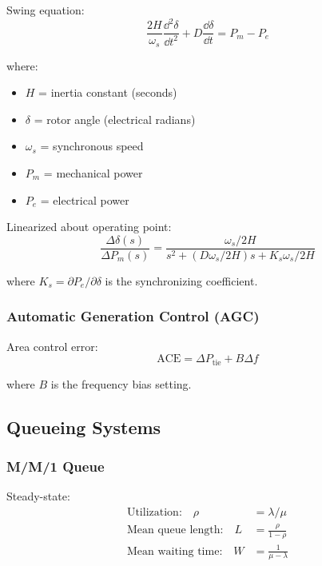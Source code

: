 Swing equation:
\begin{equation}
\frac{2H}{\omega_s}\frac{\dd^2\delta}{\dd t^2} + D\frac{\dd\delta}{\dd t} = P_m - P_e
\end{equation}

where:
\begin{itemize}
    \item $H$ = inertia constant (seconds)
    \item $\delta$ = rotor angle (electrical radians)
    \item $\omega_s$ = synchronous speed
    \item $P_m$ = mechanical power
    \item $P_e$ = electrical power
\end{itemize}

Linearized about operating point:
\begin{equation}
\frac{\Delta\delta(s)}{\Delta P_m(s)} = \frac{\omega_s/2H}{s^2 + (D\omega_s/2H)s + K_s\omega_s/2H}
\end{equation}

where $K_s = \partial P_e/\partial\delta$ is the synchronizing coefficient.

\subsubsection{Automatic Generation Control (AGC)}

Area control error:
\begin{equation}
\text{ACE} = \Delta P_{\text{tie}} + B\Delta f
\end{equation}

where $B$ is the frequency bias setting.

\subsection{Queueing Systems}
\label{subsec:queueing}

\subsubsection{M/M/1 Queue}



Steady-state:
\begin{align}
\text{Utilization:} \quad \rho &= \lambda/\mu \\
\text{Mean queue length:} \quad L &= \frac{\rho}{1-\rho} \\
\text{Mean waiting time:} \quad W &= \frac{1}{\mu - \lambda}
\end{align}


